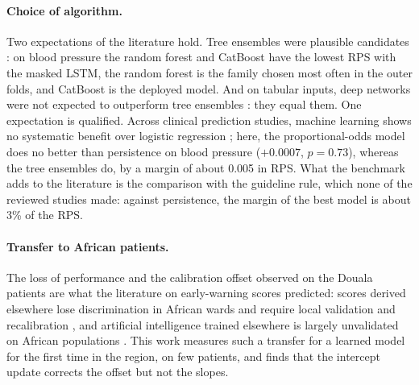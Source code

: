 \paragraph{Choice of algorithm.} Two expectations of the literature hold. Tree ensembles were plausible candidates \parencite{mendoza2025,liu2025review}: on blood pressure the random forest and CatBoost have the lowest RPS with the masked LSTM, the random forest is the family chosen most often in the outer folds, and CatBoost is the deployed model. And on tabular inputs, deep networks were not expected to outperform tree ensembles \parencite{grinsztajn2022}: they equal them. One expectation is qualified. Across clinical prediction studies, machine learning shows no systematic benefit over logistic regression \parencite{christodoulou2019}; here, the proportional-odds model does no better than persistence on blood pressure ($+0.0007$, $p = 0.73$), whereas the tree ensembles do, by a margin of about 0.005 in RPS. What the benchmark adds to the literature is the comparison with the guideline rule, which none of the reviewed studies made: against persistence, the margin of the best model is about 3\% of the RPS.

\paragraph{Transfer to African patients.} The loss of performance and the calibration offset observed on the Douala patients are what the literature on early-warning scores predicted: scores derived elsewhere lose discrimination in African wards and require local validation and recalibration \parencite{moore2017uva,tomas2026ews}, and artificial intelligence trained elsewhere is largely unvalidated on African populations \parencite{segun2025}. This work measures such a transfer for a learned model for the first time in the region, on few patients, and finds that the intercept update corrects the offset but not the slopes.

